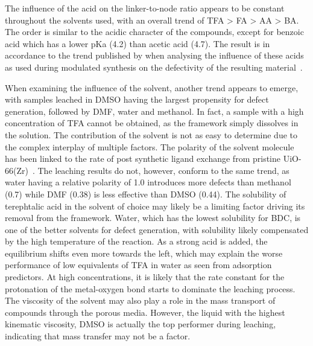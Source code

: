 The influence of the acid on the linker-to-node ratio appears to be
constant throughout the solvents used, with an overall trend of 
\gls{TFA} > \gls{FA} > \gls{AA} > \gls{BA}. The order is similar
to the acidic character of the compounds, except for
benzoic acid which has a lower pKa (4.2) than acetic acid (4.7).
The result is in accordance to the trend published by 
\citeauthor{shearerDefectEngineeringTuning2016} when analysing
the influence of these acids as used during modulated synthesis on the
defectivity of the resulting material~\cite{shearerDefectEngineeringTuning2016}.

When examining the influence of the solvent, another trend appears
to emerge, with samples leached in \gls{DMSO} having the largest propensity
for defect generation, followed by \gls{DMF}, water and methanol. In fact,
a sample with a high concentration of \gls{TFA} cannot be obtained, as the 
framework simply dissolves in the solution.
The contribution of the solvent is not as easy to determine due
to the complex interplay of multiple factors.
The polarity of the solvent molecule has been linked to 
the rate of post synthetic ligand exchange from
pristine UiO-66(Zr)~\cite{kimPostsyntheticLigandExchange2012}. The leaching
results do not, however, conform to the same trend, as water having a 
relative polarity of 1.0 introduces more defects than methanol 
(0.7) while \gls{DMF} (0.38) is less effective than 
\gls{DMSO} (0.44). The solubility of terephtalic acid in the solvent 
of choice may likely be a limiting factor driving its removal
from the framework. Water, which has the lowest solubility for 
\gls{BDC}, is one of the better solvents for defect generation, with
solubility likely compensated by the high temperature of the reaction. 
As a strong acid is added, the equilibrium shifts even more towards the 
left, which may explain the worse performance of low equivalents 
of \gls{TFA} in water as seen from adsorption predictors. 
At high concentrations, it is likely that the rate constant for the
protonation of the metal-oxygen bond starts to dominate the leaching
process. The viscosity of the 
solvent may also play a role in the mass transport of compounds 
through the porous media. However, the liquid with the highest 
kinematic viscosity, \gls{DMSO} is actually the top performer during leaching,
indicating that mass transfer may not be a factor.

